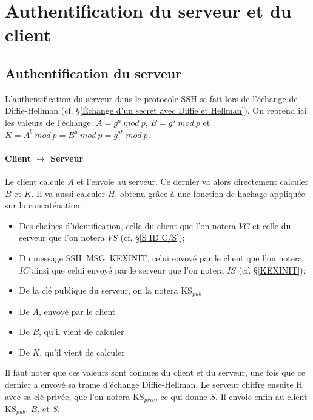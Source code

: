 \section{Authentification du serveur et du client}

\subsection{Authentification du serveur} \label{Server's authentication}

L'authentification du serveur dans le protocole SSH se fait lors de l'échange de Diffie-Hellman (cf. §\ref{Échange d'un secret avec Diffie et Hellman}). On reprend ici les valeurs de l'échange: $A = g^a \: mod \: p$, $B = g^a \: mod \: p$ et $K = A^b \: mod \: p= B^a \: mod \: p=g^{ab} \: mod \: p$.

\paragraph{Client $\rightarrow$ Serveur}
Le client calcule $A$ et l'envoie au serveur. Ce dernier va alors directement calculer $B$ et $K$. Il va aussi calculer $H$, obtenu grâce à une fonction de hachage appliquée sur la concaténation:

\begin{itemize}
\item Des chaînes d'identification, celle du client que l'on notera $VC$ et celle du serveur que l'on notera $VS$ (cf. §\ref{S ID C/S});
\item Du message {\ttfamily SSH\verb|_|MSG\verb|_|KEXINIT}, celui envoyé par le client que l'on notera $IC$ ainsi que celui envoyé par le serveur que l'on notera $IS$ (cf. §\ref{KEXINIT});
\item De la clé publique du serveur, on la notera KS$_{pub}$
\item De $A$, envoyé par le client
\item De $B$, qu'il vient de calculer
\item De $K$, qu'il vient de calculer
\end{itemize}
Il faut noter que ces valeurs sont connues du client et du serveur, une fois que ce dernier a envoyé sa trame d'échange Diffie-Hellman. Le serveur chiffre ensuite H avec sa clé privée, que l'on notera KS$_{priv}$, ce qui donne $S$. Il envoie enfin au client KS$_{pub}$, $B$, et $S$.  \cite{lonvick_secure_2006} \label{ID C/S}

